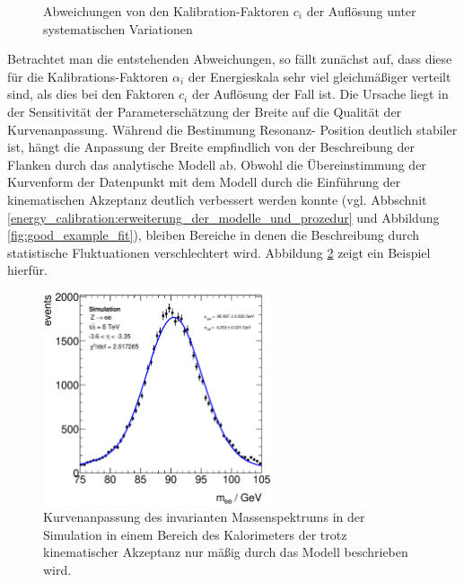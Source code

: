 \begin{figure}[h]
\begin{minipage}[t]{0.48\textwidth}
        \captionsetup{format=plain}
        \caption{Abweichungen von den Kalibration-Faktoren $c_i$ der
        Auflösung unter systematischen Variationen}
        \label{fig:cdata_uncert}
    \end{minipage}
\end{figure}

Betrachtet man die entstehenden Abweichungen, so fällt zunächst auf, dass diese
für die Kalibrations-Faktoren $\alpha_i$ der Energieskala sehr viel
gleichmäßiger verteilt sind, als dies bei den Faktoren $c_i$ der Auflösung der
Fall ist. Die Ursache liegt in der Sensitivität der Parameterschätzung der
Breite auf die Qualität der Kurvenanpassung. Während die Bestimmung Resonanz-
Position deutlich stabiler ist, hängt die Anpassung der Breite empfindlich von
der Beschreibung der Flanken durch das analytische Modell ab. Obwohl die
Übereinstimmung der Kurvenform der Datenpunkt mit dem Modell durch die
Einführung der kinematischen Akzeptanz deutlich verbessert werden konnte (vgl.
Abbschnit \ref{energy_calibration:erweiterung_der_modelle_und_prozedur} und
Abbildung \ref{fig:good_example_fit}), bleiben Bereiche in denen die
Beschreibung durch statistische Fluktuationen verschlechtert wird. Abbildung
\ref{fig:still_bad_fit} zeigt ein Beispiel hierfür.

\begin{figure}
    \centering
    \includegraphics[width=0.6\textwidth]{plots/still_bad_fit}
    \caption[Kurvenanpassung des inv. Massenspektrums in einem Bereich, der
        trotz kinematischer Akzeptanz schlecht beschrieben wird]
        {Kurvenanpassung des invarianten Massenspektrums in der Simulation in
        einem Bereich des Kalorimeters der trotz kinematischer Akzeptanz nur
        mäßig durch das Modell beschrieben wird.}
    \label{fig:still_bad_fit}
\end{figure}

